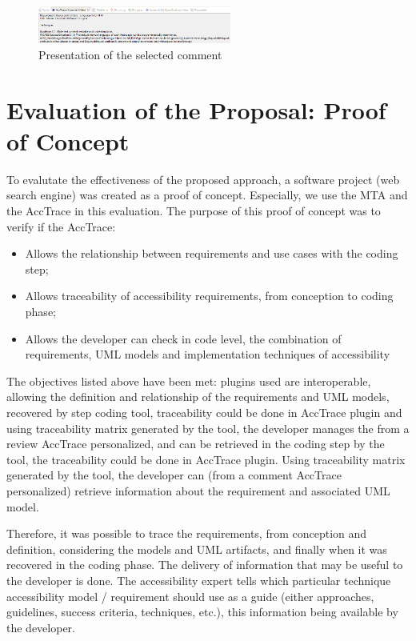 \documentclass[10pt, conference, compsocconf]{IEEEtran}
\begin{document}
\begin{figure}[!t]
\centering
\includegraphics[width=2.5in]{./img/commentview.png}
\caption{Presentation of the selected comment}
\label{fig:commentview}
\end{figure}

\section{Evaluation of the Proposal: Proof of Concept} 

To evalutate the effectiveness of the proposed approach, a software project (web search engine) was created as a proof of concept. Especially, we use the MTA and the AccTrace in this evaluation. The purpose of this proof of concept was to verify if the AccTrace:

\begin{itemize}
  \item Allows the relationship between requirements and use cases with the coding step;
  \item Allows traceability of accessibility requirements, from conception to coding phase;   
  \item Allows the developer can check in code level, the combination of requirements, UML models and implementation techniques of accessibility
\end{itemize}

The objectives listed above have been met:
plugins used are interoperable, allowing the definition and relationship of the requirements and UML models, recovered by step coding tool, traceability could be done in AccTrace plugin and using traceability matrix generated by the tool, the developer manages the from a review AccTrace personalized, and can be retrieved in the coding step by the tool, the traceability could be done in AccTrace plugin. Using traceability matrix generated by the tool, the developer can (from a comment AccTrace personalized) retrieve information about the requirement and associated UML model.

Therefore, it was possible to trace the requirements, from conception and definition, considering the models and UML artifacts,
and finally when it was recovered in the coding phase. The delivery of information that may be useful to the developer is done.
The accessibility expert tells which particular technique accessibility
model / requirement should use as a guide (either approaches, guidelines, success criteria,
techniques, etc.), this information being available by the developer.
\end{document}
